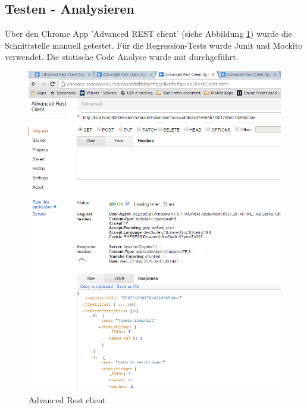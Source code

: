 \subsection{Testen - Analysieren}
 Über den Chrome App 'Advanced REST client' (siehe Abbildung \ref{fig:advanced_rest_client})  wurde die Schnittstelle manuell getestet. Für die Regression-Tests wurde Junit und Mockito 
verwendet. Die statische Code Analyse wurde mit  \cite{sonar} durchgeführt.

\begin{figure}[h]
\centering
\includegraphics[scale=0.7]{images/advanced_rest_client.png}
\caption[Advanced Rest client]{Advanced Rest client \selfmade{}}
\label{fig:advanced_rest_client}
\end{figure}